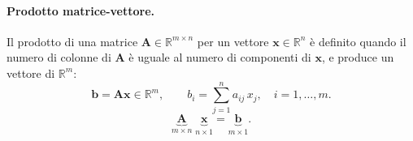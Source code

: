 \paragraph{Prodotto matrice-vettore.}
Il prodotto di una matrice $\bm{A} \in \mathbb{R}^{m \times n}$ per un vettore $\bm{x} \in \mathbb{R}^{n}$ \`e definito quando il numero di colonne di $\bm{A}$ \`e uguale al numero di componenti di $\bm{x}$, e produce un vettore di $\mathbb{R}^{m}$:
\begin{equation}\label{eq:prod_mat_vec}
	\bm{b} = \bm{A}\bm{x} \in \mathbb{R}^{m}, \qquad b_{i} = \sum_{j=1}^{n} a_{ij}\, x_j, \quad i=1,\ldots,m.
\end{equation}
\begin{equation}\label{eq:consist_mat_vec}
	\underbrace{\bm{A}}_{m \times n}\;\underbrace{\bm{x}}_{n \times 1} = \underbrace{\bm{b}}_{m \times 1}.
\end{equation}



